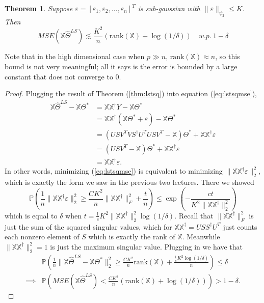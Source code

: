\documentclass[11pt]{article}
\newtheorem{theorem}{Theorem}
\begin{document}
	\begin{theorem}
		Suppose $ \varepsilon = [\varepsilon_1,\varepsilon_2,\ldots,\varepsilon_n]^T $ is sub-gaussian with $ \|\varepsilon\|_{\psi_2}\leq K $. Then 
		\[ MSE(\mathbb{X}\hat{\Theta}^{LS}) \lesssim \frac{K^2}{n}\left( \text{rank}(\mathbb{X}) + \log(1/\delta) \right)\quad w.p. ~ 1-\delta \]
	\end{theorem}
	
	Note that in the high dimensional case when $ p \gg n $, $ \text{rank}(\mathbb{X})\approx n $, so this bound is not very meaningful; all it says is the error is bounded by a large constant that does not converge to $ 0 $.
	
	\begin{proof}
		Plugging the result of Theorem (\ref{thm:lstsq}) into equation (\ref{eq:lstsqmse}),
		\begin{align*}
			\mathbb{X}\hat{\Theta}^{LS} - \mathbb{X}\Theta^* &= \mathbb{X}\mathbb{X}^\dagger Y - \mathbb{X}\Theta^*\\
			&= \mathbb{X}\mathbb{X}^\dagger (\mathbb{X} \Theta^* + \varepsilon) - \mathbb{X}\Theta^*\\
			&= (USV^TVS^\dagger U^TUSV^T - \mathbb{X}) \Theta^* + \mathbb{X}\mathbb{X}^\dagger \varepsilon\\
			&= (USV^T - \mathbb{X}) \Theta^* + \mathbb{X}\mathbb{X}^\dagger \varepsilon\\
			&= \mathbb{X}\mathbb{X}^\dagger \varepsilon.
		\end{align*}
	In other words, minimizing (\ref{eq:lstsqmse}) is equivalent to minimizing $ \| \mathbb{X}\mathbb{X}^\dagger \varepsilon \|_2^2 $, which is exactly the form we saw in the previous two lectures. There we showed
	\begin{equation*}
		\mathbb{P}\left(\frac{1}{n}\|\mathbb{X}\mathbb{X}^\dagger \varepsilon\|_2^2 \ge \frac{CK^2}{n}\|\mathbb{X}\mathbb{X}^\dagger \|_F^2 +\frac{t}{n}\right) \le \exp\left(-\frac{ct}{K^2\|\mathbb{X}\mathbb{X}^\dagger\|_2^2}\right)
	\end{equation*}
	which is equal to $ \delta $ when $ t=\frac{1}{c}K^2 \|\mathbb{X}\mathbb{X}^\dagger\|_2^2\log (1/\delta) $. Recall that $ \|\mathbb{X}\mathbb{X}^\dagger\|_F^2 $ is just the sum of the squared singular values, which for $ \mathbb{X}\mathbb{X}^\dagger = USS^\dagger U^T $ just counts each nonzero element of $ S $ which is exactly the rank of $ \mathbb{X} $. Meanwhile $ \|\mathbb{X}\mathbb{X}^\dagger\|_2^2=1 $ is just the maximum singular value. Plugging in we have that 
	\begin{align*}
		&\mathbb{P}\left(\frac{1}{n}\|\mathbb{X}\hat{\Theta}^{LS} - \mathbb{X}\Theta^*\|_2^2 \ge \frac{CK^2}{n}\text{rank}(\mathbb{X}) +\frac{\frac{1}{c}K^2\log(1/\delta)}{n}\right) \le \delta\\
		\implies &  \mathbb{P}\left(MSE(\mathbb{X}\hat{\Theta}^{LS}) < \frac{CK^2}{n}\left( \text{rank}(\mathbb{X}) + \log(1/\delta) \right)\right) > 1-\delta.
	\end{align*}
	\end{proof}
	
\end{document}
